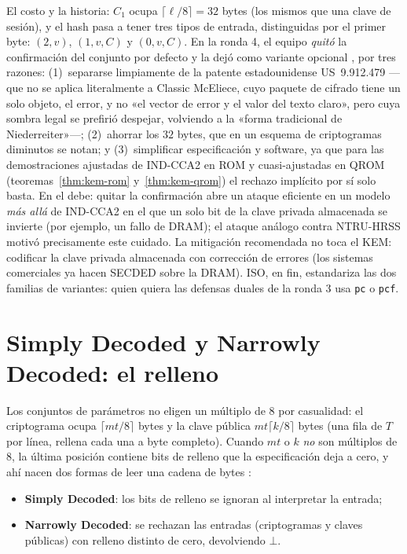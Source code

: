 El costo y la historia: $C_1$ ocupa $\lceil\ell/8\rceil=32$ bytes (los
mismos que una clave de sesión), y el hash pasa a tener tres tipos de
entrada, distinguidas por el primer byte: $(2,v)$, $(1,v,C)$ y
$(0,v,C)$. En la ronda 4, el equipo \emph{quitó} la confirmación del
conjunto por defecto y la dejó como variante opcional
\cite{cmmods3}, por tres razones: (1)~separarse limpiamente de la
patente estadounidense US~9.912.479 ---que no se aplica literalmente
a Classic McEliece, cuyo paquete de cifrado tiene un solo objeto, el
error, y no «el vector de error y el valor del texto claro», pero cuya
sombra legal se prefirió despejar, volviendo a la «forma tradicional
de Niederreiter»---; (2)~ahorrar los $32$ bytes, que en un esquema de
criptogramas diminutos se notan; y (3)~simplificar especificación y
software, ya que para las demostraciones ajustadas de IND-CCA2 en ROM
y cuasi-ajustadas en QROM (teoremas~\ref{thm:kem-rom}
y~\ref{thm:kem-qrom}) el rechazo implícito por sí solo basta.
En el debe: quitar la confirmación abre un ataque eficiente en un
modelo \emph{más allá} de IND-CCA2 en el que un solo bit de la clave
privada almacenada se invierte (por ejemplo, un fallo de DRAM); el
ataque análogo contra NTRU-HRSS \cite{ntrufault} motivó precisamente
este cuidado. La mitigación recomendada no toca el KEM: codificar la
clave privada almacenada con corrección de errores (los sistemas
comerciales ya hacen SECDED sobre la DRAM). ISO, en fin, estandariza
las dos familias de variantes: quien quiera las defensas duales de la
ronda 3 usa \texttt{pc} o \texttt{pcf}.

\section{Simply Decoded y Narrowly Decoded: el relleno}
\label{sec:param-narrowly}

Los conjuntos de parámetros no eligen un múltiplo de $8$ por
casualidad: el criptograma ocupa $\lceil mt/8\rceil$ bytes y la clave
pública $mt\lceil k/8\rceil$ bytes (una fila de $T$ por línea, rellena
cada una a byte completo). Cuando $mt$ o $k$ \emph{no} son múltiplos
de $8$, la última posición contiene bits de relleno que la
especificación deja a cero, y ahí nacen dos formas de leer una cadena
de bytes \cite{cmspec}:

\begin{itemize}[leftmargin=1.5em,itemsep=3pt]
  \item \textbf{Simply Decoded}: los bits de relleno se ignoran al
        interpretar la entrada;
  \item \textbf{Narrowly Decoded}: se rechazan las entradas
        (criptogramas y claves públicas) con relleno distinto de
        cero, devolviendo $\bot$.
\end{itemize}

